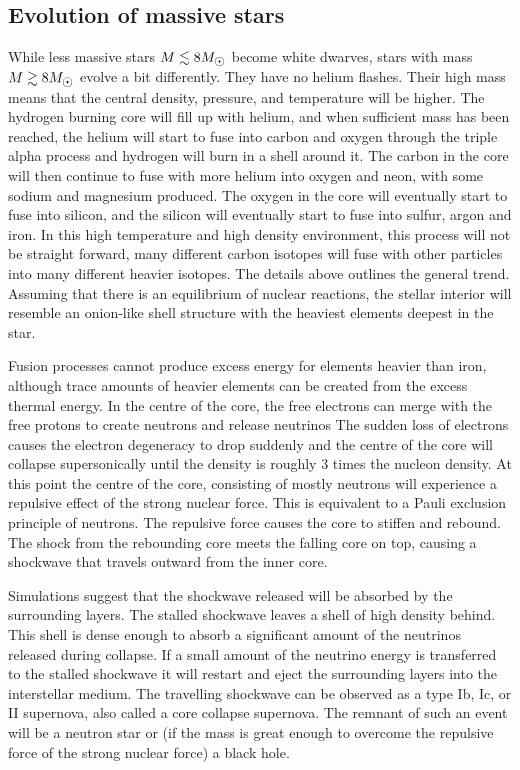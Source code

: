 \subsection{Evolution of massive stars}
While less massive stars $M \lesssim 8 \msol$ become white dwarves, stars with mass $M \gtrsim 8 \msol$ evolve a bit differently.
They have no helium flashes.
Their high mass means that the central density, pressure, and temperature will be higher.
The hydrogen burning core will fill up with helium, and when sufficient mass has been reached, the helium will start to fuse into carbon and oxygen through the triple alpha process and hydrogen will burn in a shell around it.
The carbon in the core will then continue to fuse with more helium into oxygen and neon, with some sodium and magnesium produced.
The oxygen in the core will eventually start to fuse into silicon, and the silicon will eventually start to fuse into sulfur, argon and iron.
In this high temperature and high density environment, this process will not be straight forward, many different carbon isotopes will fuse with other particles into many different heavier isotopes. The details above outlines the general trend.
Assuming that there is an equilibrium of nuclear reactions, the stellar interior will resemble an onion-like shell structure with the heaviest elements deepest in the star.

Fusion processes cannot produce excess energy for elements heavier than iron, although trace amounts of heavier elements can be created from the excess thermal energy.
In the centre of the core, the free electrons can merge with the free protons to create neutrons and release neutrinos
The sudden loss of electrons causes the electron degeneracy to drop suddenly and the centre of the core will collapse supersonically until the density is roughly 3 times the nucleon density.
At this point the centre of the core, consisting of mostly neutrons will experience a repulsive effect of the strong nuclear force.
This is equivalent to a Pauli exclusion principle of neutrons.
The repulsive force causes the core to stiffen and rebound. The shock from the rebounding core meets the falling core on top, causing a shockwave that travels outward from the inner core.

Simulations suggest that the shockwave released will be absorbed by the surrounding layers.
The stalled shockwave leaves a shell of high density behind.
This shell is dense enough to absorb a significant amount of the neutrinos released during collapse.
If a small amount of the neutrino energy is transferred to the stalled shockwave it will restart and eject the surrounding layers into the interstellar medium.
The travelling shockwave can be observed as a type Ib, Ic, or II supernova, also called a core collapse supernova.
The remnant of such an event will be a neutron star or (if the mass is great enough to overcome the repulsive force of the strong nuclear force) a black hole.

